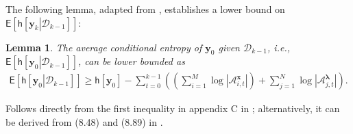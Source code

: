 \documentclass[10pt,twocolumn,twoside]{IEEEtran}
\newtheorem{lemma}{Lemma}
\begin{document}
The following lemma, adapted from  \cite{NE04},
establishes a lower bound on ${\ensuremath{\mathsf{E}\left[{{\ensuremath{\mathsf{h}\left[\left.{{\ensuremath{\boldsymbol{{y}}}}_{k}}\right|{\mathcal{D}_{k-1}}\right]}}} \right]}}$:
\begin{lemma}\label{Lem: NE}
The average conditional entropy of ${\ensuremath{\boldsymbol{{y}}}}_0$ given $\mathcal{D}_{k-1}$, \emph{i.e.,} ${\ensuremath{\mathsf{E}\left[{{\ensuremath{\mathsf{h}\left[\left.{{\ensuremath{\boldsymbol{{y}}}}_{0}}\right|{\mathcal{D}_{k-1}}\right]}}} \right]}}$, can be lower bounded as
\begin{eqnarray}
{\ensuremath{\mathsf{E}\left[{{\ensuremath{\mathsf{h}\left[\left.{{\ensuremath{\boldsymbol{{y}}}}_{0}}\right|{\mathcal{D}_{k-1}}\right]}}} \right]}}\!\geq \!\mathsf{h}\left[{\ensuremath{\boldsymbol{{y}}}}_{0}\right]\!-\!\sum_{t=0}^{k-1}\!{\left({\!\!\!{\left({\sum_{i=1}^M\log{\left|{\mathcal{A}^{{\ensuremath{\boldsymbol{{x}}}}}_{i,t}}\right|}}\right)}\!\!+\!\!\sum_{j=1}^N\log{\left|{\mathcal{A}^{{\ensuremath{\boldsymbol{{\lambda}}}}}_{j,t}}\right|}\!\!}\right)}.\nonumber
\end{eqnarray}
\end{lemma}
\begin{IEEEproof}
 Follows directly from the first inequality in appendix C in  \cite{NE04}; alternatively, it can be derived from (8.48) and (8.89) in \cite{Cover}.
\end{IEEEproof}
\end{document}

